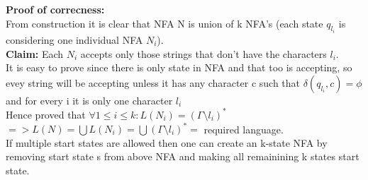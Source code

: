 \documentclass{article}
\begin{document}
\begin{enumerate}
\textbf{Proof of correcness: }\\
From construction it is clear that NFA N is union of k NFA's (each state $q_{l_i}$ is considering one individual NFA $N_i$).\\
\textbf{Claim: } Each $N_i$ accepts only those strings that don't have the characters $l_{i}$.\\
It is easy to prove since there is only state in NFA and that too is accepting, so evey string will be accepting unless it has any character c such that $\delta(q_{l_i},c) = \phi$ and 
for every i it is only one character $l_i$\\
Hence proved that $\forall 1 \leq i \leq k : L(N_i) = (\Gamma \setminus {l_i})^{*} $\\
$=> L(N) = \bigcup L(N_i) = \bigcup (\Gamma \setminus {l_i})^{*} = $ required language.\\

If multiple start states are allowed then one can create an k-state NFA by removing start state s from above NFA and making all remainining k states 
start state.
\end{enumerate}

\pagebreak
\end{document}

